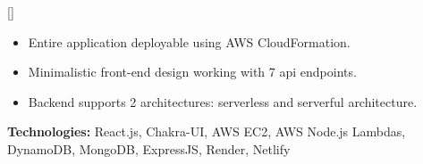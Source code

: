 \documentclass{article}
\begin{document}
[] 

\begin{itemize}
\item Entire application deployable using AWS CloudFormation.
\item Minimalistic front-end design working with 7 api endpoints.
\item Backend supports 2 architectures: serverless and serverful architecture.

\end{itemize}

\textbf{Technologies:} React.js, Chakra-UI, AWS EC2, AWS Node.js Lambdas, DynamoDB, MongoDB, ExpressJS, Render, Netlify




\end{document}
